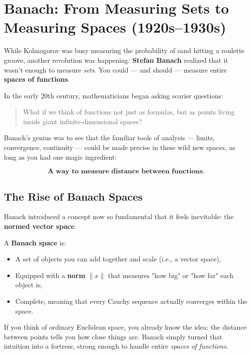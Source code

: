 \section{Banach: From Measuring Sets to Measuring Spaces (1920s–1930s)}

While Kolmogorov was busy measuring the probability of sand hitting a roulette groove, another revolution was happening:  
\textbf{Stefan Banach} realized that it wasn’t enough to measure \textit{sets}.  
You could — and should — measure entire \textbf{spaces of functions}.

In the early 20th century, mathematicians began asking scarier questions:

\begin{quote}
    What if we think of functions not just as formulas, but as points living inside giant infinite-dimensional spaces?
\end{quote}

Banach’s genius was to see that the familiar tools of analysis — limits, convergence, continuity — could be made precise in these wild new spaces, as long as you had one magic ingredient:

\[
\textbf{A way to measure distance between functions.}
\]

\subsection*{The Rise of Banach Spaces}

Banach introduced a concept now so fundamental that it feels inevitable: the \textbf{normed vector space}.  

A \textbf{Banach space} is:

\begin{itemize}
    \item A set of objects you can add together and scale (i.e., a vector space),
    \item Equipped with a \textbf{norm} \( \|x\| \) that measures "how big" or "how far" each object is,
    \item Complete, meaning that every Cauchy sequence actually converges within the space.
\end{itemize}

If you think of ordinary Euclidean space, you already know the idea:  
the distance between points tells you how close things are.  
Banach simply turned that intuition into a fortress, strong enough to handle entire \textit{spaces of functions}.

\smallskip


